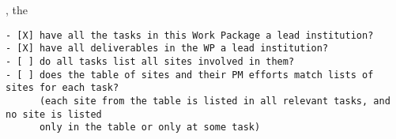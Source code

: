 \begin{draft}
, the
\begin{verbatim}
- [X] have all the tasks in this Work Package a lead institution?
- [X] have all deliverables in the WP a lead institution?
- [ ] do all tasks list all sites involved in them? 
- [ ] does the table of sites and their PM efforts match lists of sites for each task?
      (each site from the table is listed in all relevant tasks, and no site is listed
      only in the table or only at some task)
\end{verbatim}

\end{draft}

\def\DKS{\ensuremath{\mathcal{DKS}}\xspace}

